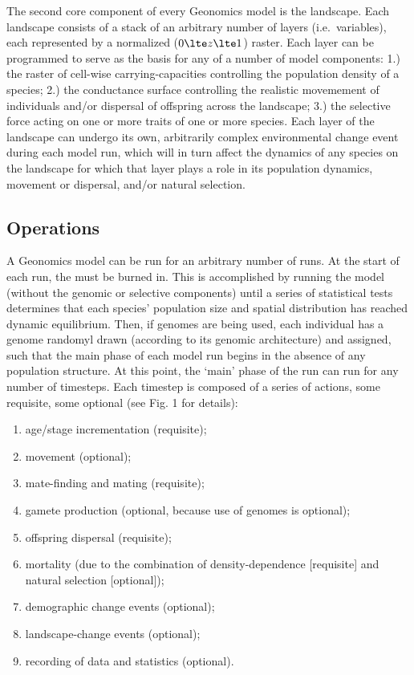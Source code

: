 ﻿\documentclass{article}
\begin{document}
The second core component of every Geonomics model is the landscape.
Each landscape consists of a stack of an arbitrary number of layers (i.e.\ variables),
each represented by a normalized ($0 \lte z \lte 1$) raster.
Each layer can be programmed to serve as the basis for any of a number of model components:
1.) the raster of cell-wise carrying-capacities controlling the population density of a species;
2.) the conductance surface controlling the realistic movemement of individuals and/or 
dispersal of offspring across the landscape;
3.) the selective force acting on one or more traits  of one or more species.
Each layer of the landscape can undergo its own, arbitrarily complex environmental
change event during each model run, which will in turn affect the dynamics
of any species on the landscape for which that layer plays a role in its
population dynamics, movement or dispersal, and/or natural selection.

\subsection{Operations}
A Geonomics model can be run for an arbitrary number of runs.
At the start of each run, the must be burned in.
This is accomplished by running the model (without the genomic or
selective components) until a series of statistical tests determines that each species'
population size and spatial distribution has reached dynamic equilibrium.
Then, if genomes are being used, each individual has a genome randomyl drawn
(according to its genomic architecture) and assigned, such that the main phase
of each model run begins in the absence of any population structure.
At this point, the `main' phase of the run can run for any number of timesteps. 
Each timestep is composed of a series of actions, some requisite, some optional (see Fig. 1 for details):
\begin{enumerate}
  \item age/stage incrementation (requisite);
  \item movement (optional);
  \item mate-finding and  mating (requisite);
  \item gamete production (optional, because use of genomes is optional);
  \item offspring dispersal (requisite);
  \item mortality (due to the combination of density-dependence [requisite] and natural selection [optional]);
  \item demographic change events (optional);
  \item landscape-change events (optional);
  \item recording of data and statistics (optional). 
\end{enumerate}
\end{document}
